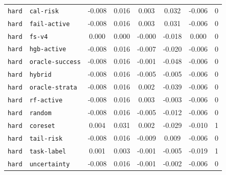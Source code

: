 \documentclass{article}
\begin{document}
\begin{center}
\begin{tabular}{llcccccc}
\texttt{hard} & \texttt{cal-risk} & -0.008 & 0.016 & 0.003 & 0.032 & -0.006 & 0 \\
\texttt{hard} & \texttt{fail-active} & -0.008 & 0.016 & 0.003 & 0.031 & -0.006 & 0 \\
\texttt{hard} & \texttt{fs-v4} & 0.000 & 0.000 & -0.000 & -0.018 & 0.000 & 0 \\
\texttt{hard} & \texttt{hgb-active} & -0.008 & 0.016 & -0.007 & -0.020 & -0.006 & 0 \\
\texttt{hard} & \texttt{oracle-success} & -0.008 & 0.016 & -0.001 & -0.048 & -0.006 & 0 \\
\texttt{hard} & \texttt{hybrid} & -0.008 & 0.016 & -0.005 & -0.005 & -0.006 & 0 \\
\texttt{hard} & \texttt{oracle-strata} & -0.008 & 0.016 & 0.002 & -0.039 & -0.006 & 0 \\
\texttt{hard} & \texttt{rf-active} & -0.008 & 0.016 & 0.003 & -0.003 & -0.006 & 0 \\
\texttt{hard} & \texttt{random} & -0.008 & 0.016 & -0.005 & -0.012 & -0.006 & 0 \\
\texttt{hard} & \texttt{coreset} & 0.004 & 0.031 & 0.002 & -0.029 & -0.010 & 1 \\
\texttt{hard} & \texttt{tail-risk} & -0.008 & 0.016 & -0.009 & 0.009 & -0.006 & 0 \\
\texttt{hard} & \texttt{task-label} & 0.001 & 0.003 & -0.001 & -0.005 & -0.019 & 1 \\
\texttt{hard} & \texttt{uncertainty} & -0.008 & 0.016 & -0.001 & -0.002 & -0.006 & 0 \\
\bottomrule
\end{tabular}
\end{center}
\normalsize
\end{document}
